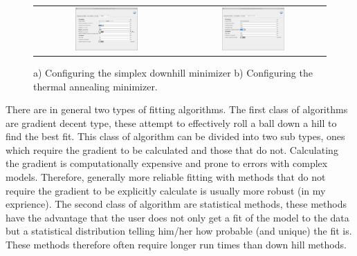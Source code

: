 \begin{figure}[H]
\centering
\begin{tabular}{ c c }

\includegraphics[width=0.45\textwidth]{./images/fit/configure_minimizer_simplex.png}
&
\includegraphics[width=0.45\textwidth]{./images/fit/configure_minimizer_thermal.png}
\\
\end{tabular}
\caption{a) Configuring the simplex downhill minimizer b) Configuring the thermal annealing minimizer.}
\label{fig:minimizer_config}
\end{figure}

There are in general two types of fitting algorithms. The first class of algorithms are gradient decent type, these attempt to effectively roll a ball down a hill to find the best fit. This class of algorithm can be divided into two sub types, ones which require the gradient to be calculated and those that do not. Calculating the gradient is computationally expensive and prone to errors with complex models. Therefore, generally more reliable fitting with methods that do not require the gradient to be explicitly calculate is usually more robust (in my exprience). The second class of algorithm are statistical methods, these methods have the advantage that the user does not only get a fit of the model to the data but a statistical distribution telling him/her how probable (and unique) the fit is. These methods therefore often require longer run times than down hill methods.

